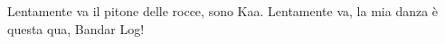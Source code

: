 \chordsoff
\beginverse*
Lentamente va il pitone delle rocce, sono Kaa.
Lentamente va, la mia danza è questa qua, Bandar Log!
\endverse
\endsong